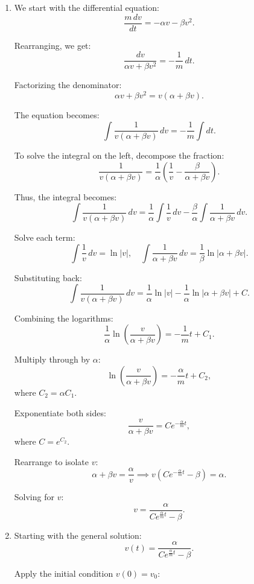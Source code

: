 \documentclass[12pt]{article}
\begin{document}
\begin{enumerate}
\begin{enumerate}
\item We start with the differential equation:
    \[
    \frac{m \, dv}{dt} = -\alpha v - \beta v^2.
    \]

    Rearranging, we get:
    \[
    \frac{dv}{\alpha v + \beta v^2} = -\frac{1}{m} \, dt.
    \]

    Factorizing the denominator:
    \[
    \alpha v + \beta v^2 = v(\alpha + \beta v).
    \]

    The equation becomes:
    \[
    \int \frac{1}{v(\alpha + \beta v)} \, dv = -\frac{1}{m} \int dt.
    \]

    To solve the integral on the left, decompose the fraction:
    \[
    \frac{1}{v(\alpha + \beta v)} = \frac{1}{\alpha} \left( \frac{1}{v} - \frac{\beta}{\alpha + \beta v} \right).
    \]

    Thus, the integral becomes:
    \[
    \int \frac{1}{v(\alpha + \beta v)} \, dv = \frac{1}{\alpha} \int \frac{1}{v} \, dv - \frac{\beta}{\alpha} \int \frac{1}{\alpha + \beta v} \, dv.
    \]

    Solve each term:
    \[
    \int \frac{1}{v} \, dv = \ln|v|, \quad \int \frac{1}{\alpha + \beta v} \, dv = \frac{1}{\beta} \ln|\alpha + \beta v|.
    \]

    Substituting back:
    \[
    \int \frac{1}{v(\alpha + \beta v)} \, dv = \frac{1}{\alpha} \ln|v| - \frac{1}{\alpha} \ln|\alpha + \beta v| + C.
    \]

    Combining the logarithms:
    \[
    \frac{1}{\alpha} \ln\left(\frac{v}{\alpha + \beta v}\right) = -\frac{1}{m}t + C_1.
    \]

    Multiply through by \( \alpha \):
    \[
    \ln\left(\frac{v}{\alpha + \beta v}\right) = -\frac{\alpha}{m}t + C_2,
    \]
    where \( C_2 = \alpha C_1 \).

    Exponentiate both sides:
    \[
    \frac{v}{\alpha + \beta v} = Ce^{-\frac{\alpha}{m}t},
    \]
    where \( C = e^{C_2} \).

    Rearrange to isolate \( v \):
    \[
    \alpha + \beta v = \frac{\alpha}{v} \implies v \left(Ce^{-\frac{\alpha}{m}t} - \beta\right) = \alpha.
    \]

    Solving for \( v \):
    \[
    v = \frac{\alpha}{Ce^{\frac{\alpha}{m}t} - \beta}.
    \]

\item 
    Starting with the general solution:
    \[
    v(t) = \frac{\alpha}{C e^{\frac{\alpha}{m}t} - \beta}.
    \]
    
    Apply the initial condition \(v(0) = v_0\):
    

\end{enumerate}
\end{enumerate}
\end{document}
